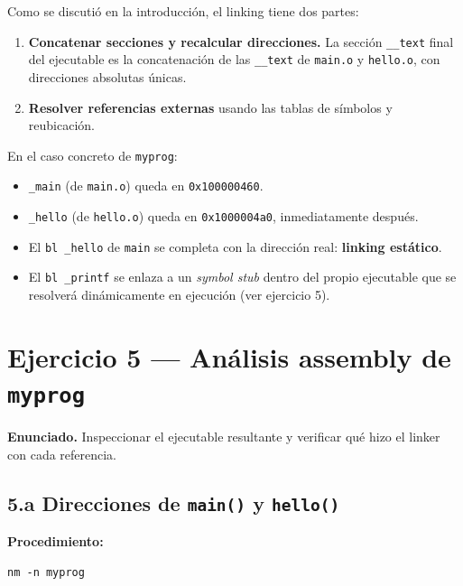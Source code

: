 \documentclass[11pt,a4paper]{article}
\begin{document}
Como se discutió en la introducción, el linking tiene dos partes:

\begin{enumerate}[leftmargin=*]
    \item \textbf{Concatenar secciones y recalcular direcciones.}
        La sección \texttt{\_\_text} final del ejecutable es la
        concatenación de las \texttt{\_\_text} de \texttt{main.o} y
        \texttt{hello.o}, con direcciones absolutas únicas.
    \item \textbf{Resolver referencias externas} usando las tablas de
        símbolos y reubicación.
\end{enumerate}

En el caso concreto de \texttt{myprog}:

\begin{itemize}[leftmargin=*, itemsep=0pt]
    \item \texttt{\_main} (de \texttt{main.o}) queda en
        \texttt{0x100000460}.
    \item \texttt{\_hello} (de \texttt{hello.o}) queda en
        \texttt{0x1000004a0}, inmediatamente después.
    \item El \texttt{bl \_hello} de \texttt{main} se completa con la
        dirección real: \textbf{linking estático}.
    \item El \texttt{bl \_printf} se enlaza a un \emph{symbol stub}
        dentro del propio ejecutable que se resolverá dinámicamente
        en ejecución (ver ejercicio 5).
\end{itemize}

\section{Ejercicio 5 --- Análisis assembly de \texttt{myprog}}

\textbf{Enunciado.} Inspeccionar el ejecutable resultante y verificar
qué hizo el linker con cada referencia.

\subsection*{5.a Direcciones de \texttt{main()} y \texttt{hello()}}

\textbf{Procedimiento:}

\begin{lstlisting}
nm -n myprog
\end{lstlisting}
\end{document}
